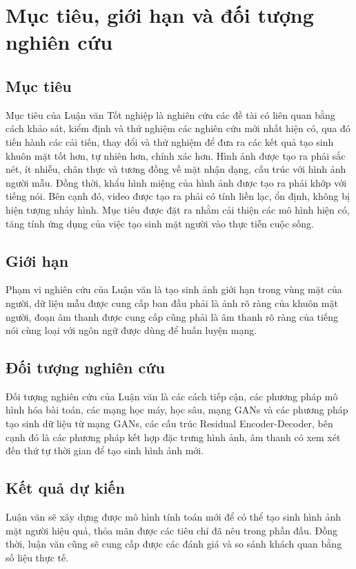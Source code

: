 \section{\texorpdfstring{Mục tiêu, giới hạn và đối tượng nghiên cứu}{Target, limitation}}
\subsection{\texorpdfstring{Mục tiêu}{Target}}
Mục tiêu của Luận văn Tốt nghiệp là nghiên cứu các đề tài có liên quan bằng cách khảo sát, kiểm định và thử nghiệm các nghiên cứu mới nhất hiện có, qua đó tiến hành các cải tiến, thay đổi và thử nghiệm để đưa ra các kết quả tạo sinh khuôn mặt tốt hơn, tự nhiên hơn, chính xác hơn. Hình ảnh được tạo ra phải sắc nét, ít nhiễu, chân thực và tương đồng về mặt nhận dạng, cấu trúc với hình ảnh người mẫu. Đồng thời, khẩu hình miệng của hình ảnh được tạo ra phải khớp với tiếng nói. Bên cạnh đó, video được tạo ra phải có tính liền lạc, ổn định, không bị hiện tượng nhảy hình. Mục tiêu được đặt ra nhằm cải thiện các mô hình hiện có, tăng tính ứng dụng của việc tạo sinh mặt người vào thực tiễn cuộc sống.

\subsection{\texorpdfstring{Giới hạn}{Limitation}}
Phạm vi nghiên cứu của Luận văn là tạo sinh ảnh giới hạn trong vùng mặt của người, dữ liệu mẫu được cung cấp ban đầu phải là ảnh rõ ràng của khuôn mặt người, đoạn âm thanh được cung cấp cũng phải là âm thanh rõ ràng của tiếng nói cùng loại với ngôn ngữ được dùng để huấn luyện mạng.

\subsection{\texorpdfstring{Đối tượng nghiên cứu}{Research}}
Đối tượng nghiên cứu của Luận văn là các cách tiếp cận, các phương pháp mô hình hóa bài toán, các mạng học máy, học sâu, mạng GANs và các phương pháp tạo sinh dữ liệu từ mạng GANs, các cấu trúc Residual Encoder-Decoder, bên cạnh đó là các phương pháp kết hợp đặc trưng hình ảnh, âm thanh có xem xét đến thứ tự thời gian để tạo sinh hình ảnh mới.

\subsection{\texorpdfstring{Kết quả dự kiến}{Result}}
Luận văn sẽ xây dựng được mô hình tính toán mới để có thể tạo sinh hình ảnh mặt người hiệu quả, thỏa mãn được các tiêu chí đã nêu trong phần đầu. Đồng thời, luận văn cũng sẽ cung cấp được các đánh giá và so sánh khách quan bằng số liệu thực tế.
